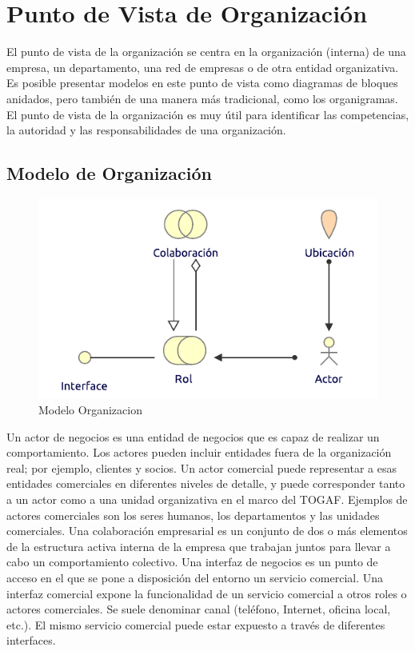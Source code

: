 \section{Punto de Vista de Organización}

El punto de vista de la organización se centra en la organización (interna) de una empresa, un departamento, una red de empresas o de otra entidad organizativa. Es posible presentar modelos en este punto de vista como diagramas de bloques anidados, pero también de una manera más tradicional, como los organigramas. El punto de vista de la organización es muy útil para identificar las competencias, la autoridad y las responsabilidades de una organización.

\subsection{Modelo de Organización}
\begin{figure}[h!]
	\centering
	\includegraphics[width=.6\linewidth]{imgs/modelo/Organizacion}
	\caption{Modelo Organizacion}
\end{figure}

Un actor de negocios es una entidad de negocios que es capaz de realizar un comportamiento. Los actores pueden incluir entidades fuera de la organización real; por ejemplo, clientes y socios. Un actor comercial puede representar a esas entidades comerciales en diferentes niveles de detalle, y puede corresponder tanto a un actor como a una unidad organizativa en el marco del TOGAF. Ejemplos de actores comerciales son los seres humanos, los departamentos y las unidades comerciales. Una colaboración empresarial es un conjunto de dos o más elementos de la estructura activa interna de la empresa que trabajan juntos para llevar a cabo un comportamiento colectivo. Una interfaz de negocios es un punto de acceso en el que se pone a disposición del entorno un servicio comercial. Una interfaz comercial expone la funcionalidad de un servicio comercial a otros roles o actores comerciales. Se suele denominar canal (teléfono, Internet, oficina local, etc.). El mismo servicio comercial puede estar expuesto a través de diferentes interfaces.

